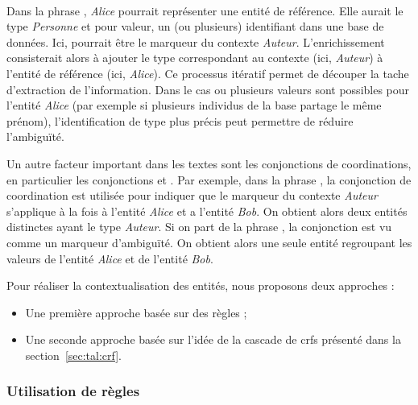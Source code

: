 \paragraph{}
Dans la phrase , \emph{Alice} pourrait représenter une entité de référence.
Elle aurait le type \emph{Personne} et pour valeur, un (ou plusieurs) identifiant dans une base de données.
Ici,  pourrait être le marqueur du contexte \emph{Auteur}.
L'enrichissement consisterait alors à ajouter le type correspondant au contexte (ici, \emph{Auteur}) à l'entité de référence (ici, \emph{Alice}).
Ce processus itératif permet de découper la tache d'extraction de l'information.
Dans le cas ou plusieurs valeurs sont possibles pour l'entité \emph{Alice} (par exemple si plusieurs individus de la base partage le même prénom), l'identification de type plus précis peut permettre de réduire l'ambiguïté.

Un autre facteur important dans les textes sont les conjonctions de coordinations, en particulier les conjonctions  et .
Par exemple, dans la phrase , la conjonction de coordination  est utilisée pour indiquer que le marqueur du contexte \emph{Auteur} s'applique à la fois à l'entité \emph{Alice} et a l'entité \emph{Bob}.
On obtient alors deux entités distinctes ayant le type \emph{Auteur}.
Si on part de la phrase , la conjonction  est vu comme un marqueur d'ambiguïté.
On obtient alors une seule entité regroupant les valeurs de l'entité \emph{Alice} et de l'entité \emph{Bob}.

Pour réaliser la contextualisation des entités, nous proposons deux approches :
\begin{itemize}
      \item Une première approche basée sur des règles ;
      \item Une seconde approche basée sur l'idée de la cascade de \glspl{crf} présenté dans la section~\ref{sec:tal:crf}.
\end{itemize}

\subsubsection{Utilisation de règles}
\label{sec:tal:ctx:rule}

